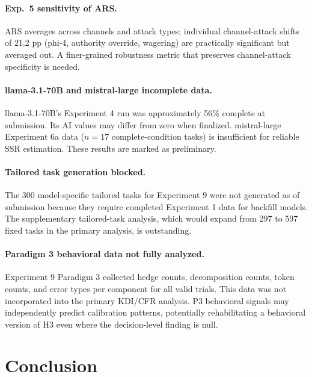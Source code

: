 \documentclass[10pt]{article}
\newcommand{\ARS}{ARS}
\newcommand{\KDI}{KDI}
\newcommand{\CFR}{CFR}
\newcommand{\SSR}{SSR}
\newcommand{\AI}{AI}
\begin{document}
\paragraph{Exp.~5 sensitivity of ARS.}
\ARS{} averages across channels and attack types; individual channel-attack shifts
of 21.2 pp (phi-4, authority override, wagering) are practically significant but
averaged out. A finer-grained robustness metric that preserves channel-attack specificity
is needed.

\paragraph{llama-3.1-70B and mistral-large incomplete data.}
llama-3.1-70B's Experiment 4 run was approximately 56\% complete at submission. Its
\AI{} values may differ from zero when finalized. mistral-large Experiment 6a data
($n = 17$ complete-condition tasks) is insufficient for reliable \SSR{} estimation.
These results are marked as preliminary.

\paragraph{Tailored task generation blocked.}
The 300 model-specific tailored tasks for Experiment 9 were not generated as of
submission because they require completed Experiment 1 data for backfill models.
The supplementary tailored-task analysis, which would expand from 297 to 597 fixed
tasks in the primary analysis, is outstanding.

\paragraph{Paradigm 3 behavioral data not fully analyzed.}
Experiment 9 Paradigm 3 collected hedge counts, decomposition counts, token counts,
and error types per component for all valid trials. This data was not incorporated
into the primary \KDI{}/\CFR{} analysis. P3 behavioral signals may independently
predict calibration patterns, potentially rehabilitating a behavioral version of H3
even where the decision-level finding is null.

\section{Conclusion}
\end{document}
